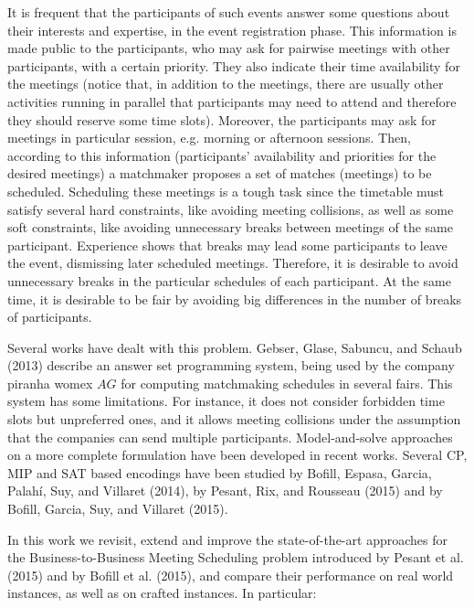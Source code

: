 \documentclass[10pt]{article}
\begin{document}
It is frequent that the participants of such events answer some questions about their interests and expertise, in the event registration phase. This information is made public to the participants, who may ask for pairwise meetings with other participants, with a certain priority. They also indicate their time availability for the meetings (notice that, in addition to the meetings, there are usually other activities running in parallel that participants may need to attend and therefore they should reserve some time slots). Moreover, the participants may ask for meetings in particular session, e.g. morning or afternoon sessions. Then, according to this information (participants' availability and priorities for the desired meetings) a matchmaker proposes a set of matches (meetings) to be scheduled. Scheduling these meetings is a tough task since the timetable must satisfy several hard constraints, like avoiding meeting collisions, as well as some soft constraints, like avoiding unnecessary breaks between meetings of the same participant. Experience shows that breaks may lead some participants to leave the event, dismissing later scheduled meetings. Therefore, it is desirable to avoid unnecessary breaks in the particular schedules of each participant. At the same time, it is desirable to be fair by avoiding big differences in the number of breaks of participants.

Several works have dealt with this problem. Gebser, Glase, Sabuncu, and Schaub (2013) describe an answer set programming system, being used by the company piranha womex $A G$ for computing matchmaking schedules in several fairs. This system has some limitations. For instance, it does not consider forbidden time slots but unpreferred ones, and it allows meeting collisions under the assumption that the companies can send multiple participants. Model-and-solve approaches on a more complete formulation have been developed in recent works. Several CP, MIP and SAT based encodings have been studied by Bofill, Espasa, Garcia, Palahí, Suy, and Villaret (2014), by Pesant, Rix, and Rousseau (2015) and by Bofill, Garcia, Suy, and Villaret (2015).

In this work we revisit, extend and improve the state-of-the-art approaches for the Business-to-Business Meeting Scheduling problem introduced by Pesant et al. (2015) and by Bofill et al. (2015), and compare their performance on real world instances, as well as on crafted instances. In particular:
\end{document}

